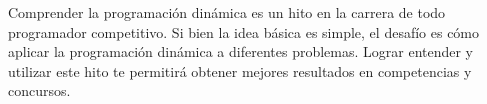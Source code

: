 Comprender la programación dinámica es un hito en la carrera de todo programador competitivo. Si bien la idea básica es simple, el desafío es cómo aplicar la programación dinámica a diferentes problemas. Lograr entender y utilizar este hito te permitirá obtener mejores resultados en competencias y concursos.